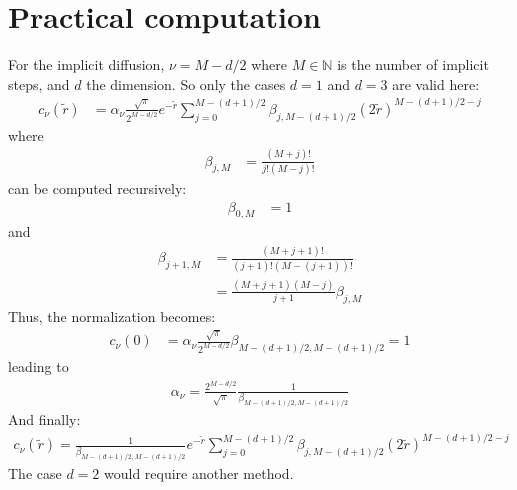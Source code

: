 \documentclass[12pt]{scrartcl}
\begin{document}
\section{Practical computation}
For the implicit diffusion, $\nu = M-d/2$ where $M \in \mathbb{N}$ is the number of implicit steps, and $d$ the dimension. So only the cases $d=1$ and $d=3$ are valid here:
\begin{align}
c_\nu(\tilde{r}) & = \alpha_\nu \frac{\sqrt{\pi}}{2^{M-d/2}} e^{-\tilde{r}} \sum_{j=0}^{M-(d+1)/2} \beta_{j,M-(d+1)/2} (2\tilde{r})^{M-(d+1)/2-j}
\end{align}
where
\begin{align}
\beta_{j,M} & = \frac{\left(M+j\right)!}{j!\left(M-j\right)!}
\end{align}
can be computed recursively:
\begin{align}
\beta_{0,M} & = 1
\end{align}
and 
\begin{align}
\beta_{j+1,M} & = \frac{\left(M+j+1\right)!}{(j+1)!\left(M-(j+1)\right)!} \\
& = \frac{(M+j+1)(M-j)}{j+1} \beta_{j,M}
\end{align}
Thus, the normalization becomes:
\begin{align}
c_\nu(0) & = \alpha_\nu \frac{\sqrt{\pi}}{2^{M-d/2}} \beta_{M-(d+1)/2,M-(d+1)/2} = 1
\end{align}
leading to
\begin{align}
\alpha_\nu = \frac{2^{M-d/2}}{\sqrt{\pi}} \frac{1}{\beta_{M-(d+1)/2,M-(d+1)/2}}
\end{align}
And finally:
\begin{align}
c_\nu(\tilde{r}) = \frac{1}{\beta_{M-(d+1)/2,M-(d+1)/2}} e^{-\tilde{r}} \sum_{j=0}^{M-(d+1)/2} \beta_{j,M-(d+1)/2} (2\tilde{r})^{M-(d+1)/2-j}
\end{align}
The case $d=2$ would require another method.



\end{document}
